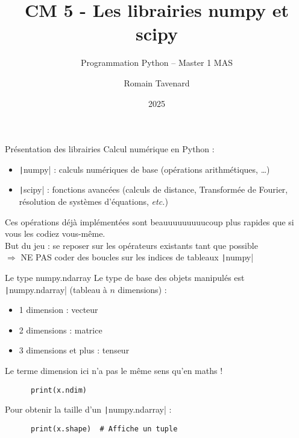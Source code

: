 \documentclass[10pt]{beamer}
\title[M1 MAS -- Python -- numpy]{CM 5 - Les librairies numpy et scipy}
\subtitle{Programmation Python -- Master 1 MAS}
\author{Romain Tavenard}
\date{2025}
\institute{%
\hypersetup{urlcolor=.}
\makebox[2.2ex][c]{\faEnvelope}\enspace\href{mailto:romain.tavenard@univ-rennes2.fr}{\texttt{romain.tavenard@univ-rennes2.fr}}\\%
}
\begin{document}
\maketitle

\begin{frame}[fragile]{Présentation des librairies}  
  Calcul numérique en Python :
  \begin{itemize}
    \item \texttt|numpy| : calculs numériques de base (opérations arithmétiques, \dots)
    \item \texttt|scipy| : fonctions avancées (calculs de distance, Transformée de Fourier, résolution de systèmes d'équations, \emph{etc.})
  \end{itemize}

  \pause

  Ces opérations déjà implémentées sont \alert{beauuuuuuuuucoup} plus rapides que si vous les codiez vous-même. \\
  \alert{But du jeu :} se reposer sur les opérateurs existants tant que possible \\
  $\Rightarrow$ \alert{NE PAS} coder des boucles sur les indices de tableaux \texttt|numpy|

\end{frame}

\begin{frame}[fragile]{Le type numpy.ndarray}  
  Le type de base des objets manipulés est \texttt|numpy.ndarray| (tableau à $n$ dimensions) :
  \begin{itemize}
    \item 1 dimension : vecteur
    \item 2 dimensions : matrice
    \item 3 dimensions et plus : tenseur
  \end{itemize}

  \alert{Le terme dimension ici n'a pas le même sens qu'en maths !}

  \begin{beamercodeblock}
    \begin{verbatim}
      print(x.ndim)
    \end{verbatim}
  \end{beamercodeblock}

  Pour obtenir la taille d'un \texttt|numpy.ndarray| : 

  \begin{beamercodeblock}
    \begin{verbatim}
      print(x.shape)  # Affiche un tuple
    \end{verbatim}
  \end{beamercodeblock}
\end{frame}
\end{document}
